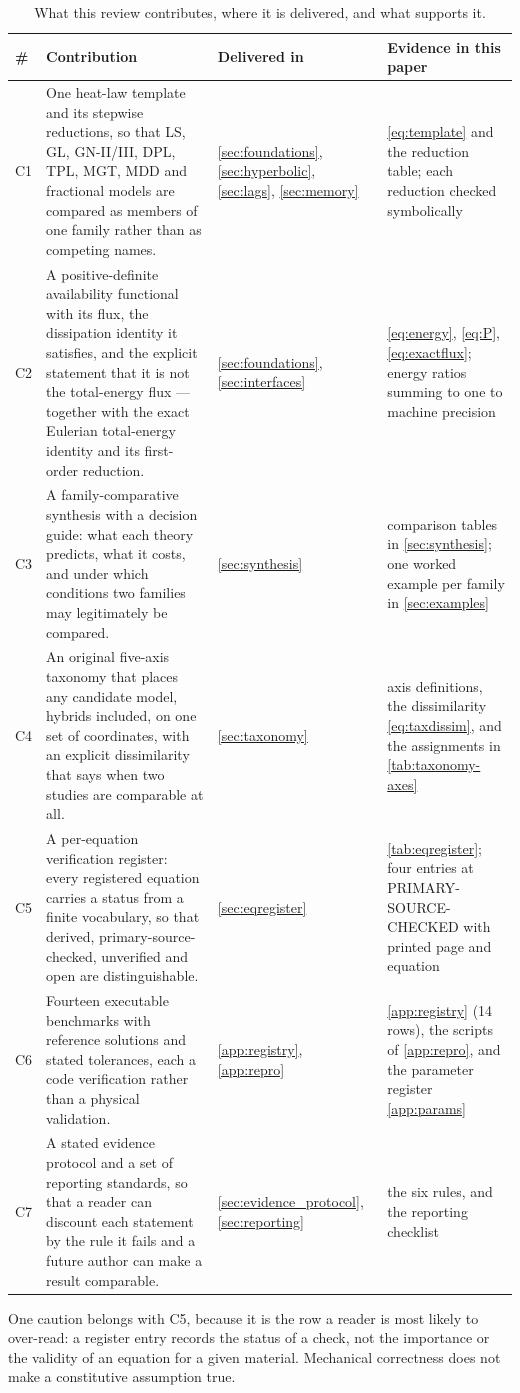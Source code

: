 \begin{table}[H]\centering\small
\caption{What this review contributes, where it is delivered, and what supports it.}
\label{tab:contributions}
\begin{tabularx}{\textwidth}{@{}p{0.5cm}Y p{2.5cm}Y@{}}
\toprule
\textbf{\#} & \textbf{Contribution} & \textbf{Delivered in} & \textbf{Evidence in this paper} \\
\midrule
C1 & One heat-law template and its stepwise reductions, so that LS, GL, GN-II/III, DPL, TPL, MGT, MDD
  and fractional models are compared as members of one family rather than as competing names. &
  \cref{sec:foundations}, \cref{sec:hyperbolic}, \cref{sec:lags}, \cref{sec:memory} &
  \eqref{eq:template} and the reduction table; each reduction checked symbolically \\
C2 & A positive-definite availability functional with its flux, the dissipation identity it satisfies,
  and the explicit statement that it is not the total-energy flux --- together with the exact Eulerian
  total-energy identity and its first-order reduction. & \cref{sec:foundations}, \cref{sec:interfaces} &
  \eqref{eq:energy}, \eqref{eq:P}, \eqref{eq:exactflux}; energy ratios summing to one to machine precision \\
C3 & A family-comparative synthesis with a decision guide: what each theory predicts, what it costs, and
  under which conditions two families may legitimately be compared. & \cref{sec:synthesis} &
  comparison tables in \cref{sec:synthesis}; one worked example per family in \cref{sec:examples} \\
C4 & An original five-axis taxonomy that places any candidate model, hybrids included, on one set of
  coordinates, with an explicit dissimilarity that says when two studies are comparable at all. &
  \cref{sec:taxonomy} & axis definitions, the dissimilarity \eqref{eq:taxdissim}, and the assignments in
  \cref{tab:taxonomy-axes} \\
C5 & A per-equation verification register: every registered equation carries a status from a finite
  vocabulary, so that derived, primary-source-checked, unverified and open are distinguishable. &
  \cref{sec:eqregister} & \cref{tab:eqregister}; four entries at PRIMARY-SOURCE-CHECKED with printed page
  and equation \\
C6 & Fourteen executable benchmarks with reference solutions and stated tolerances, each a code
  verification rather than a physical validation. & \cref{app:registry}, \cref{app:repro} &
  \cref{app:registry} (14 rows), the scripts of \cref{app:repro}, and the parameter register
  \cref{app:params} \\
C7 & A stated evidence protocol and a set of reporting standards, so that a reader can discount each
  statement by the rule it fails and a future author can make a result comparable. &
  \cref{sec:evidence_protocol}, \cref{sec:reporting} & the six rules, and the reporting checklist \\
\bottomrule
\end{tabularx}
\end{table}

One caution belongs with C5, because it is the row a reader is most likely to over-read: a register entry
records the status of a check, not the importance or the validity of an equation for a given material.
Mechanical correctness does not make a constitutive assumption true.
